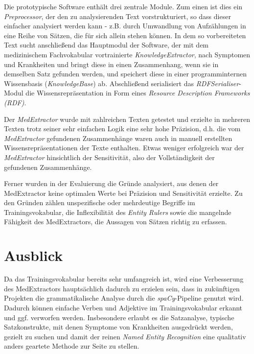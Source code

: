 Die prototypische Software enthält drei zentrale Module. Zum einen ist dies ein \emph{Preprocessor}, der den zu analysierenden Text vorstrukturiert, so dass dieser einfacher analysiert werden kann - z.B. durch Umwandlung von Aufzählungen in eine Reihe von Sätzen, die für sich allein stehen können. In dem so vorbereiteten Text sucht anschließend das Hauptmodul der Software, der mit dem medizinischem Fachvokabular vortrainierte \emph{KnowledgeExtractor}, nach Symptomen und Krankheiten und bringt diese in einen Zusammenhang, wenn sie in demselben Satz gefunden werden, und speichert diese in einer programminternen Wissensbasis (\emph{KnowledgeBase}) ab. Abschließend serialisiert das \emph{RDFSerialiser}-Modul die Wissensrepräsentation in Form eines \emph{Resource Description Frameworks (RDF)}.

Der \emph{MedExtractor} wurde mit zahlreichen Texten getestet und erzielte in mehreren Texten trotz seiner sehr einfachen Logik eine sehr hohe Präzision, d.h. die vom \emph{MedExtractor} gefundenen Zusammenhänge waren auch in manuell erstellten Wissensrepräsentationen der Texte enthalten. Etwas weniger erfolgreich war der \emph{MedExtractor} hinsichtlich der Sensitivität, also der Vollständigkeit der gefundenen Zusammenhänge.

Ferner wurden in der Evaluierung die Gründe analysiert, aus denen der MedExtractor keine optimalen Werte bei Präzision und Sensitivität erzielte. Zu den Gründen zählen unspezifische oder mehrdeutige Begriffe im Trainingsvokabular, die Inflexibilität des \emph{Entity Rulers} sowie die mangelnde Fähigkeit des MedExtractors, die Aussagen von Sätzen richtig zu erfassen.

\section{Ausblick}
\label{sec:Ausblick} 

Da das Trainingsvokabular bereits sehr umfangreich ist, wird eine Verbesserung des MedExtractors hauptsächlich dadurch zu erzielen sein, dass in zukünftigen Projekten die grammatikalische Analyse durch die \emph{spaCy}-Pipeline genutzt wird. Dadurch können einfache Verben und Adjektive im Trainingsvokabular erkannt und ggf. verworfen werden. Insbesondere erlaubt es die Satzanalyse, typische Satzkonstrukte, mit denen Symptome von Krankheiten ausgedrückt werden, gezielt zu suchen und damit der reinen \emph{Named Entity Recognition} eine qualitativ anders geartete Methode zur Seite zu stellen.

